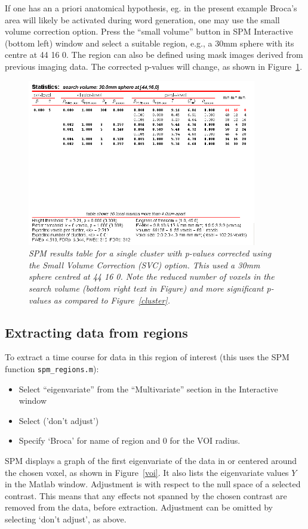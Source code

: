 If one has an a priori anatomical hypothesis, eg. in the present example Broca's area will likely be activated during word generation, one may use the small volume correction option. Press the ``small volume'' button in SPM Interactive (bottom left) window and select a suitable region, e.g., a 30mm sphere with its centre at 44 16 0.
The region can also be defined using mask images derived from previous imaging data. The corrected p-values will change,
as shown in Figure~\ref{svc}.
\begin{figure}
\begin{center}
\includegraphics[width=100mm]{pet/svc}
\caption{\em SPM results table for a single cluster with p-values corrected using the Small Volume Correction (SVC) option. This used a 30mm sphere centred at 44 16 0. Note the reduced number of voxels in the search volume (bottom right text in Figure) and more significant p-values as compared to  Figure~\ref{cluster}. \label{svc}}
\end{center}
\end{figure}

\subsection{Extracting data from regions}

To extract a time course for data in this region of interest (this uses the SPM function \texttt{spm\_regions.m}):
\begin{itemize}
\item{Select ``eigenvariate'' from the ``Multivariate'' section in the Interactive window}
\item{Select ('don't adjust')}
\item{Specify `Broca' for name of region and 0 for the VOI radius.}
\end{itemize}
SPM displays a graph of the first eigenvariate of the data in or centered around the chosen voxel, as shown in Figure~\ref{voi}. It also lists the eigenvariate values $Y$ in the Matlab window.  Adjustment is with respect to the null space of a selected contrast.
This means that any effects not spanned by the chosen contrast
are removed from the data, before extraction. Adjustment can be
omitted by selecting `don't adjust', as above.

